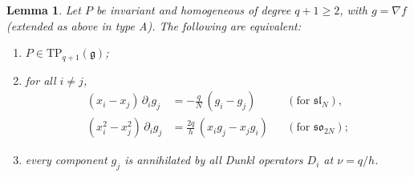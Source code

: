 \documentclass[10pt,reqno]{amsart}
\numberwithin{equation}{section}
\theoremstyle{plain}
\newtheorem{lemma}[theorem]{Lemma}
\theoremstyle{definition}
\newcommand{\TP}{\mathrm{TP}}
\begin{document}
\begin{lemma}\label{lem:TPcoords}
Let $P$ be invariant and homogeneous of degree $q+1\ge2$, with $g=\nabla f$ (extended as above in type A). The following are equivalent:
\begin{enumerate}[label=(\alph*)]
\item $P\in\TP_{q+1}(\mathfrak{g})$;
\item for all $i\neq j$,
\begin{align}
	(x_i-x_j)\,\partial_ig_j&=-\frac qN\,(g_i-g_j) &&(\text{for }\mathfrak{sl}_N), \label{eq:TPA}\\
	(x_i^2-x_j^2)\,\partial_ig_j&=\frac{2q}h\,(x_ig_j-x_jg_i) &&(\text{for }\mathfrak{so}_{2N}); \label{eq:TPD}
\end{align}
\item every component $g_j$ is annihilated by all Dunkl operators $D_i$ at $\nu=q/h$.
\end{enumerate}
\end{lemma}
\end{document}
